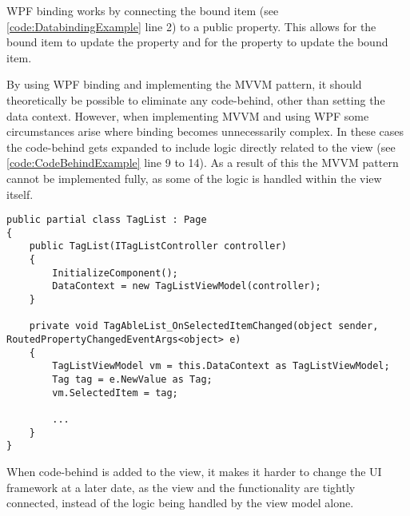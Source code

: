 WPF binding works by connecting the bound item (see \autoref{code:DatabindingExample} line 2) to a public property. This allows for the bound item to update the property and for the property to update the bound item. 
\par
By using WPF binding and implementing the MVVM pattern, it should theoretically be possible to eliminate any code-behind, other than setting the data context. However, when implementing MVVM and using WPF some circumstances arise where binding becomes unnecessarily complex. In these cases the code-behind gets expanded to include logic directly related to the view (see \autoref{code:CodeBehindExample} line 9 to 14). As a result of this the MVVM pattern cannot be implemented fully, as some of the logic is handled within the view itself.

\begin{listing}[H]
\begin{verbatim}
public partial class TagList : Page
{
    public TagList(ITagListController controller)
    {
        InitializeComponent();
        DataContext = new TagListViewModel(controller);
    }
    
    private void TagAbleList_OnSelectedItemChanged(object sender, RoutedPropertyChangedEventArgs<object> e)
    {
        TagListViewModel vm = this.DataContext as TagListViewModel;
        Tag tag = e.NewValue as Tag;
        vm.SelectedItem = tag;
        
        ...
    }
}
\end{verbatim}
\label{code:CodeBehindExample}
\end{listing}

When code-behind is added to the view, it makes it harder to change the UI framework at a later date, as the view and the functionality are tightly connected, instead of the logic being handled by the view model alone.